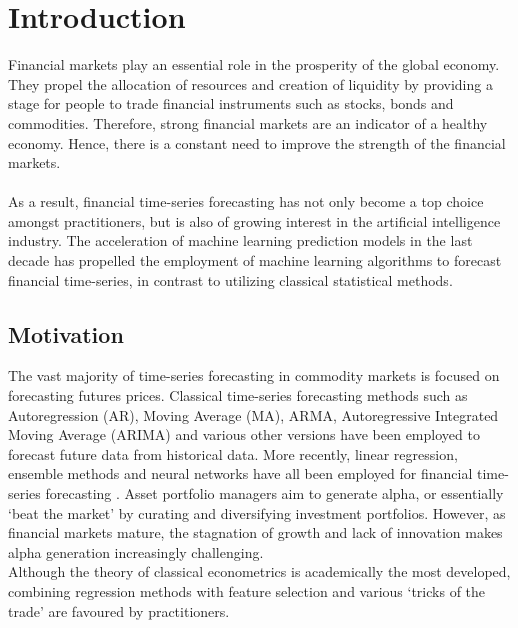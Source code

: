 \chapter{Introduction}
Financial markets play an essential role in the prosperity of the global economy. They propel the allocation of resources and creation of liquidity by providing a stage for people to trade financial instruments such as stocks, bonds and commodities. Therefore, strong financial markets are an indicator of a healthy economy. Hence, there is a constant need to improve the strength of the financial markets.\\ \\
As a result, financial time-series forecasting has not only become a top choice amongst practitioners, but is also of growing interest in the artificial intelligence industry. The acceleration of machine learning prediction models in the last decade has propelled the employment of machine learning algorithms to forecast financial time-series, in contrast to utilizing classical statistical methods. \\


\section{Motivation}
The vast majority of time-series forecasting in commodity markets is focused on forecasting futures prices. Classical time-series forecasting methods such as Autoregression (AR), Moving Average (MA), ARMA, Autoregressive Integrated Moving Average (ARIMA) and various other versions have been employed to forecast future data from historical data. More recently, linear regression, ensemble methods and neural networks have all been employed for financial time-series forecasting \cite{nielsen2019practical, lazzeri2020machine} .  Asset portfolio managers aim to generate alpha, or essentially `beat the market' by curating and diversifying investment portfolios. However, as financial markets mature, the stagnation of growth and lack of innovation makes alpha generation increasingly challenging.  \\

Although the theory of classical econometrics is academically the most developed, combining regression methods with feature selection and various `tricks of the trade' are favoured by practitioners. 

